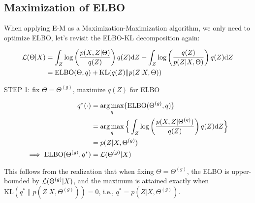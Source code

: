 \documentclass{article}
\def\L{{\cal L}}
\def\KL{\text{KL}}
\def\d{\text{d}}
\def\KL{{\text{KL}}}
\begin{document}

\subsection{Maximization of ELBO}

When applying E-M as a Maximization-Maximization algorithm, we only need to optimize ELBO, let's revisit the ELBO-KL decomposition again:


\begin{equation}\begin{split}\label{eq elbo kl decomposition}
\L(\Theta|X) &= \int_Z \log \left(\frac{p(X,Z|\Theta)}{q(Z)} \right)q(Z) \d Z + \int_Z \log \left( \frac{ q(Z)}{p(Z|X,\Theta)} \right)q(Z) \d Z\\
&= \text{ELBO} (\Theta, q ) + \KL ( q(Z) \| p(Z|X,\Theta) )\\
\end{split}\end{equation}

\begin{description}
\item [STEP 1:  fix $\Theta = \Theta^{(g)}$, maximize $q(Z)$ for ELBO] 
\end{description}



\begin{equation}\begin{split}
q^* (\cdot)&= \argmax_{q} \{ \text{ELBO} (\Theta^{(g)}, q ) \}\\
&=\argmax_{q} \Big\{ \int_Z \log \left(\frac{p(X,Z|\Theta^{(g)})}{q(Z)} \right)q(Z) \d Z \Big\}\\
&= p(Z|X, \Theta^{(g)})\\
\implies \text{ELBO} (\Theta^{(g)}, q^* )  &= \L(\Theta^{(g)}|X)
\end{split}\end{equation}

This follows from the realization that when fixing $\Theta = \Theta^{(g)}$, the ELBO is upper-bounded by $\L(\Theta^{(g)} | X)$, and the maximum is attained exactly when $\KL(q^* \| p(Z|X, \Theta^{(g)} )) = 0$, i.e., $q^* = p(Z|X, \Theta^{(g)})$.
\end{document}
